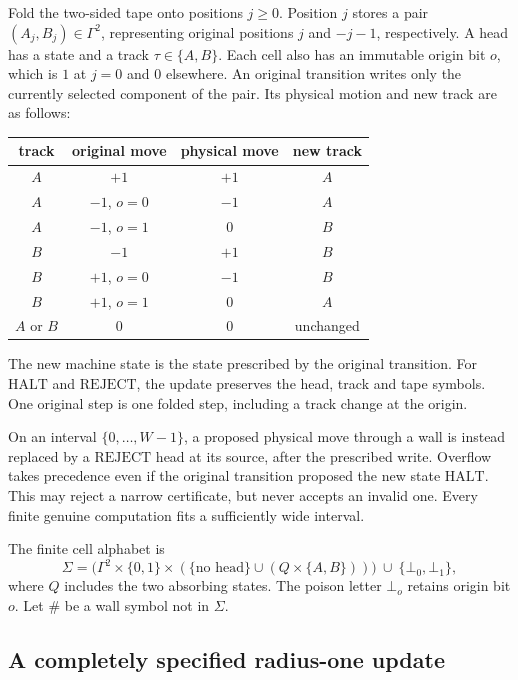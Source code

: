 \documentclass[11pt,reqno]{amsart}
\numberwithin{equation}{section}
\theoremstyle{definition}
\theoremstyle{remark}
\begin{document}
Fold the two-sided tape onto positions $j\geq0$.  Position $j$ stores a pair
$(A_j,B_j)\in\Gamma^2$, representing original positions $j$ and $-j-1$,
respectively.  A head has a state and a track $\tau\in\{A,B\}$.  Each cell
also has an immutable origin bit $o$, which is $1$ at $j=0$ and $0$
elsewhere.  An original transition writes only the currently selected
component of the pair.  Its physical motion and new track are as follows:
\begin{center}
\begin{tabular}{c|c|c|c}
track & original move & physical move & new track\\ \hline
$A$ & $+1$ & $+1$ & $A$\\
$A$ & $-1$, $o=0$ & $-1$ & $A$\\
$A$ & $-1$, $o=1$ & $0$ & $B$\\
$B$ & $-1$ & $+1$ & $B$\\
$B$ & $+1$, $o=0$ & $-1$ & $B$\\
$B$ & $+1$, $o=1$ & $0$ & $A$\\
$A$ or $B$ & $0$ & $0$ & unchanged
\end{tabular}
\end{center}
The new machine state is the state prescribed by the original transition.
For $\mathrm{HALT}$ and $\mathrm{REJECT}$, the update preserves the head,
track and tape symbols.  One original step is one folded step, including
a track change at the origin.

On an interval $\{0,\ldots,W-1\}$, a proposed physical move through a wall
is instead replaced by a $\mathrm{REJECT}$ head at its source, after the
prescribed write.  Overflow takes precedence even if the original
transition proposed the new state $\mathrm{HALT}$.  This may reject a narrow
certificate, but never accepts an invalid one.  Every finite genuine
computation fits a sufficiently wide interval.

The finite cell alphabet is
\begin{equation}
\label{appcomp:cellalphabet}
\Sigma=
\bigl(\Gamma^2\times\{0,1\}\times
 (\{\text{no head}\}\cup(Q\times\{A,B\}))\bigr)
 \ \cup\ \{\bot_0,\bot_1\},
\end{equation}
where $Q$ includes the two absorbing states.  The poison letter $\bot_o$
retains origin bit $o$.  Let $\#$ be a wall symbol not in $\Sigma$.

\subsection{A completely specified radius-one update}
\label{appcomp:localupdate}
\end{document}
